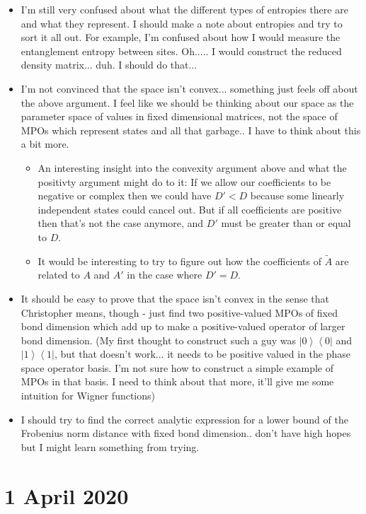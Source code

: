 \documentclass{report}
\begin{document}
\begin{itemize}
\item I'm still very confused about what the different types of entropies there are and what they represent. I should make a note about entropies and try to sort it all out. For example, I'm confused about how I would measure the entanglement entropy between sites. Oh..... I would construct the reduced density matrix... duh. I should do that...
\item I'm not convinced that the space isn't convex... something just feels off about the above argument. I feel like we should be thinking about our space as the parameter space of values in fixed dimensional matrices, not the space of MPOs which represent states and all that garbage.. I have to think about this a bit more.
	\begin{itemize}
	\item An interesting insight into the convexity argument above and what the positivty argument might do to it: If we allow our coefficients to be negative or complex then we could have $D'<D$ because some linearly independent states could cancel out. But if all coefficients are positive then that's not the case anymore, and $D'$ must be greater than or equal to $D$. 
	\item It would be interesting to try to figure out how the coefficients of $\tilde A$ are related to $A$ and $A'$ in the case where $D'=D$.
	\end{itemize}
\item It should be easy to prove that the space isn't convex in the sense that Christopher means, though - just find two positive-valued MPOs of fixed bond dimension which add up to make a positive-valued operator of larger bond dimension. (My first thought to construct such a guy was $\left|0\right>\left<0\right|$ and $\left|1\right>\left<1\right|$, but that doesn't work... it needs to be positive valued in the phase space operator basis. I'm not sure how to construct a simple example of MPOs in that basis. I need to think about that more, it'll give me some intuition for Wigner functions)
\item I should try to find the correct analytic expression for a lower bound of the Frobenius norm distance with fixed bond dimension.. don't have high hopes but I might learn something from trying. 
\end{itemize}

\chapter{1 April 2020}
\end{document}
